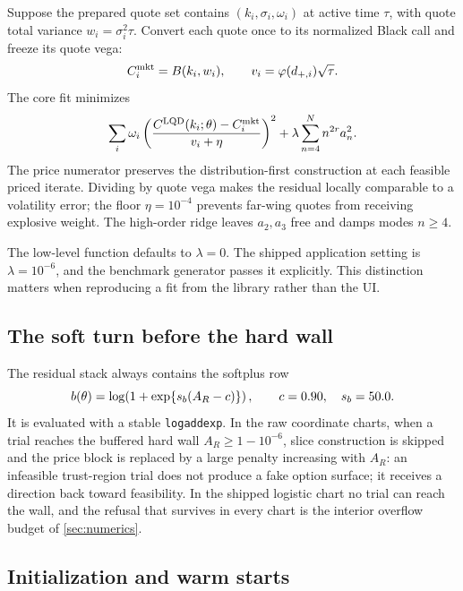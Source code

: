 \documentclass[11pt]{article}
\begin{document}
Suppose the prepared quote set contains $(k_i,\sigma_i,\omega_i)$ at active
time $\tau$, with quote total variance $w_i=\sigma_i^2\tau$.  Convert each
quote once to its normalized Black call and freeze its quote vega:
\begin{equation}
C_i^{\rm mkt}=B(k_i,w_i),\qquad
v_i=\varphi(d_{+,i})\sqrt{\tau}.
\end{equation}
The core fit minimizes
\begin{equation}
\sum_i\omega_i
\left(
\frac{C^{\rm LQD}(k_i;\theta)-C_i^{\rm mkt}}
     {v_i+\eta}
\right)^2
+\lambda\sum_{n=4}^{N}n^{2r}a_n^2.
\label{eq:objective}
\end{equation}
The price numerator preserves the distribution-first construction at each
feasible priced iterate.  Dividing by quote vega makes the residual locally
comparable to a volatility error; the floor $\eta=10^{-4}$ prevents far-wing
quotes from receiving explosive weight.  The high-order ridge leaves
$a_2,a_3$ free and damps modes $n\ge4$.

The low-level function defaults to $\lambda=0$.  The shipped application
setting is $\lambda=10^{-6}$, and the benchmark generator passes it explicitly.
This distinction matters when reproducing a fit from the library rather than
the UI.

\subsection{The soft turn before the hard wall}

The residual stack always contains the softplus row
\begin{equation}
b(\theta)=\log\!\left(1+
\exp\{s_b(A_R-c)\}\right),
\qquad c=0.90,\quad s_b=50.0.
\label{eq:barrier}
\end{equation}
It is evaluated with a stable \texttt{logaddexp}.  In the raw coordinate
charts, when a trial reaches the buffered hard wall $A_R\ge1-10^{-6}$, slice
construction is skipped and the price block is replaced by a large penalty
increasing with $A_R$: an infeasible trust-region trial does not produce a
fake option surface; it receives a direction back toward feasibility.  In
the shipped logistic chart no trial can reach the wall, and the refusal
that survives in every chart is the interior overflow budget of
\cref{sec:numerics}.

\subsection{Initialization and warm starts}
\end{document}

